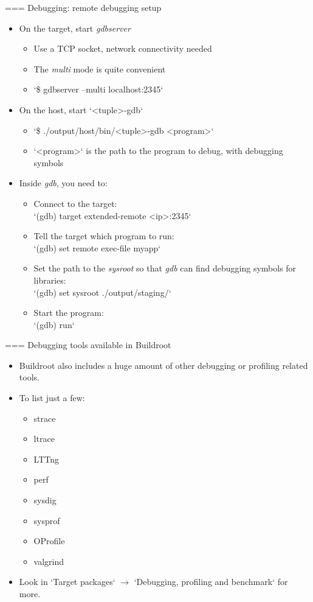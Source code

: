 === {Debugging: remote debugging setup}
  \begin{itemize}
  \item On the target, start {\em gdbserver}
    \begin{itemize}
    \item Use a TCP socket, network connectivity needed
    \item The {\em multi} mode is quite convenient
    \item `\$ gdbserver --multi localhost:2345`
    \end{itemize}
  \item On the host, start `<tuple>-gdb`
    \begin{itemize}
    \item `\$ ./output/host/bin/<tuple>-gdb <program>`
    \item `<program>` is the path to the program to debug, with
      debugging symbols
    \end{itemize}
  \item Inside {\em gdb}, you need to:
    \begin{itemize}
    \item Connect to the target:\\
      `(gdb) target extended-remote <ip>:2345`
    \item Tell the target which program to run:\\
      `(gdb) set remote exec-file myapp`
    \item Set the path to the {\em sysroot} so that {\em gdb} can find debugging symbols for libraries:\\
      `(gdb) set sysroot ./output/staging/`
    \item Start the program:\\
      `(gdb) run`
    \end{itemize}
  \end{itemize}


=== {Debugging tools available in Buildroot}
  \begin{itemize}
  \item Buildroot also includes a huge amount of other debugging or
    profiling related tools.
  \item To list just a few:
    \begin{itemize}
    \item strace
    \item ltrace
    \item LTTng
    \item perf
    \item sysdig
    \item sysprof
    \item OProfile
    \item valgrind
    \end{itemize}
  \item Look in `Target packages` $\rightarrow$ `Debugging,
      profiling and benchmark` for more.
  \end{itemize}


